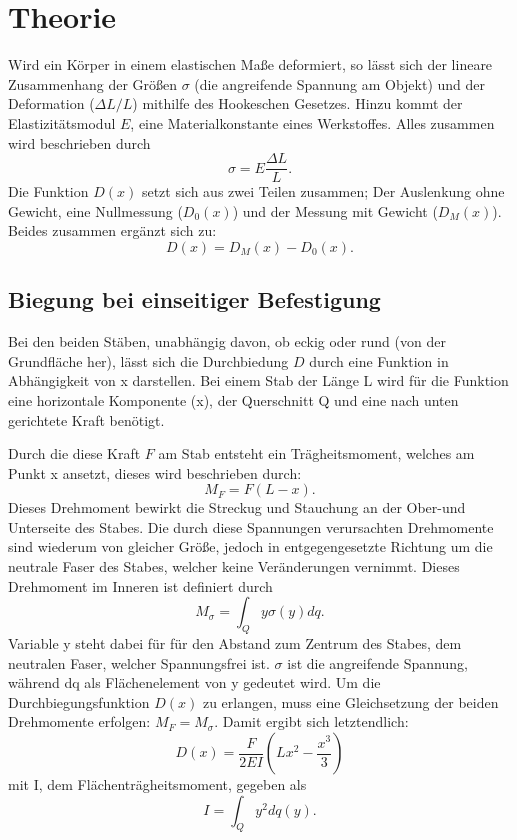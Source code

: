 \section{Theorie}
\label{sec:Theorie}

Wird ein Körper in einem elastischen Maße deformiert, so lässt sich der lineare
Zusammenhang der Größen $\sigma$ (die angreifende Spannung am Objekt) und der
Deformation ($\Delta L/L$) mithilfe des Hookeschen Gesetzes. Hinzu kommt der
Elastizitätsmodul $E$, eine Materialkonstante eines Werkstoffes. Alles zusammen 
wird beschrieben durch 
\begin{equation}
    \sigma = E \frac{\Delta L}{L}.
\end{equation}
Die Funktion $D(x)$ setzt sich aus zwei Teilen zusammen; Der Auslenkung ohne
Gewicht, eine Nullmessung ($D_0 (x)$) und der Messung mit Gewicht ($D_M (x)$).
Beides zusammen ergänzt sich zu:
\begin{equation}
    D(x) = D_M (x)-D_0 (x).
\end{equation}
\subsection{Biegung bei einseitiger Befestigung}
Bei den beiden Stäben, unabhängig davon, ob eckig oder rund (von der Grundfläche
her), lässt sich die Durchbiedung $D$ durch eine Funktion in Abhängigkeit von x
darstellen. Bei einem Stab der Länge L wird für die Funktion eine horizontale
Komponente (x), der Querschnitt Q und eine nach unten gerichtete Kraft benötigt.

\noindent Durch die diese Kraft $F$ am Stab entsteht ein Trägheitsmoment, welches am 
Punkt x ansetzt, dieses wird beschrieben durch:
\begin{equation}
    M_F = F(L-x).
\end{equation}
Dieses Drehmoment bewirkt die Streckug und Stauchung an der Ober-und Unterseite
des Stabes. Die durch diese Spannungen verursachten Drehmomente sind wiederum
von gleicher Größe, jedoch in entgegengesetzte Richtung um die neutrale Faser 
des Stabes, welcher keine Veränderungen vernimmt. Dieses Drehmoment im Inneren 
ist definiert durch 
\begin{equation}
    M_\sigma = \int_Q y \sigma (y) dq.
\end{equation}
Variable y steht dabei für für den Abstand zum Zentrum des
Stabes, dem neutralen Faser, welcher Spannungsfrei ist. $\sigma$ ist die
angreifende Spannung, während dq als Flächenelement von y gedeutet wird.
Um die Durchbiegungsfunktion $D(x)$ zu erlangen, muss eine Gleichsetzung der
beiden Drehmomente erfolgen: $M_F = M_\sigma$. Damit ergibt sich letztendlich:
\begin{equation}
    D(x)=\frac{F}{2EI} (Lx^2-\frac{x^3}{3})
\end{equation}
mit I, dem Flächenträgheitsmoment, gegeben als 
\begin{equation}
    I = \int_Q y^2 dq(y).
\end{equation}
